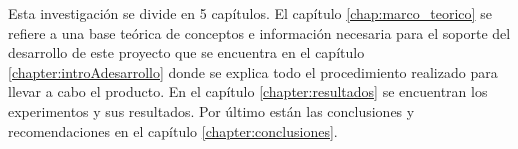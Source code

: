 


Esta investigaci\'on se divide en 5 cap\'itulos. El cap\'itulo \ref{chap:marco_teorico} se refiere a una base te\'orica de conceptos e informaci\'on necesaria para el soporte del desarrollo de este proyecto que se encuentra en el cap\'itulo  \ref{chapter:introAdesarrollo} donde se explica todo el procedimiento realizado para llevar a cabo el producto. En el cap\'itulo \ref{chapter:resultados} se encuentran  los experimentos y sus resultados. Por \'ultimo están las conclusiones y recomendaciones en el capítulo \ref{chapter:conclusiones}. 
